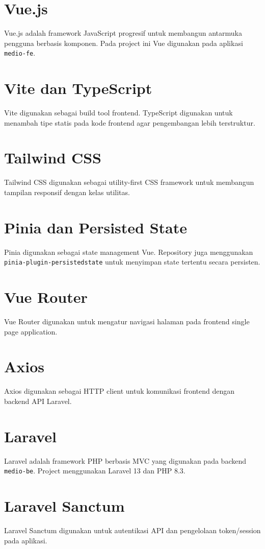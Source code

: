 \documentclass[12pt,a4paper]{report}
\begin{document}
\section{Vue.js}
Vue.js adalah framework JavaScript progresif untuk membangun antarmuka pengguna berbasis komponen. Pada project ini Vue digunakan pada aplikasi \texttt{medio-fe}.

\section{Vite dan TypeScript}
Vite digunakan sebagai build tool frontend. TypeScript digunakan untuk menambah tipe statis pada kode frontend agar pengembangan lebih terstruktur.

\section{Tailwind CSS}
Tailwind CSS digunakan sebagai utility-first CSS framework untuk membangun tampilan responsif dengan kelas utilitas.

\section{Pinia dan Persisted State}
Pinia digunakan sebagai state management Vue. Repository juga menggunakan \texttt{pinia-plugin-persistedstate} untuk menyimpan state tertentu secara persisten.

\section{Vue Router}
Vue Router digunakan untuk mengatur navigasi halaman pada frontend single page application.

\section{Axios}
Axios digunakan sebagai HTTP client untuk komunikasi frontend dengan backend API Laravel.

\section{Laravel}
Laravel adalah framework PHP berbasis MVC yang digunakan pada backend \texttt{medio-be}. Project menggunakan Laravel 13 dan PHP 8.3.

\section{Laravel Sanctum}
Laravel Sanctum digunakan untuk autentikasi API dan pengelolaan token/session pada aplikasi.
\end{document}
